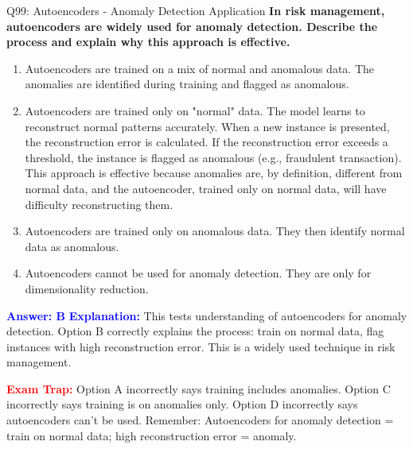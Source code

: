 \documentclass[8pt]{beamer}
\begin{document}
	\begin{frame}{Q99: Autoencoders - Anomaly Detection Application}
		\fontsize{6.5}{7.5}\selectfont
		\textbf{In risk management, autoencoders are widely used for anomaly detection. Describe the process and explain why this approach is effective.}
		
		\begin{enumerate}
			\item Autoencoders are trained on a mix of normal and anomalous data. The anomalies are identified during training and flagged as anomalous.
			\item Autoencoders are trained only on "normal" data. The model learns to reconstruct normal patterns accurately. When a new instance is presented, the reconstruction error is calculated. If the reconstruction error exceeds a threshold, the instance is flagged as anomalous (e.g., fraudulent transaction). This approach is effective because anomalies are, by definition, different from normal data, and the autoencoder, trained only on normal data, will have difficulty reconstructing them.
			\item Autoencoders are trained only on anomalous data. They then identify normal data as anomalous.
			\item Autoencoders cannot be used for anomaly detection. They are only for dimensionality reduction.
		\end{enumerate}
		
		\vspace{0.1cm}
		\textcolor{blue}{\textbf{Answer: B}}
		\vspace{0.1cm}
		\textcolor{blue}{\textbf{Explanation:}} This tests understanding of autoencoders for anomaly detection. Option B correctly explains the process: train on normal data, flag instances with high reconstruction error. This is a widely used technique in risk management.
		
		\textcolor{red}{\textbf{Exam Trap:}} Option A incorrectly says training includes anomalies. Option C incorrectly says training is on anomalies only. Option D incorrectly says autoencoders can't be used. Remember: Autoencoders for anomaly detection = train on normal data; high reconstruction error = anomaly.
	\end{frame}
	
\end{document}
